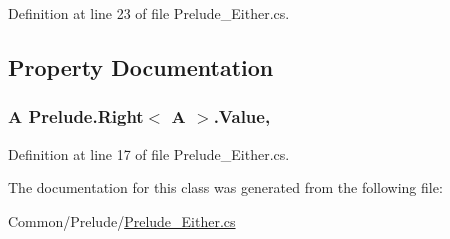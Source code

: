 Definition at line 23 of file Prelude\+\_\+\+Either.\+cs.



\subsection{Property Documentation}
\hypertarget{class_prelude_1_1_right_3_01_a_01_4_a1bf3aab3dbfdabed1a72320522f46f32}{
\subsubsection[{Value}]{\setlength{\rightskip}{0pt plus 5cm}A {\bf Prelude.\+Right}$<$ A $>$.Value\hspace{0.3cm}{\ttfamily [get]}, {\ttfamily [set]}}}\label{class_prelude_1_1_right_3_01_a_01_4_a1bf3aab3dbfdabed1a72320522f46f32}


Definition at line 17 of file Prelude\+\_\+\+Either.\+cs.



The documentation for this class was generated from the following file\+:\begin{DoxyCompactItemize}
\item 
Common/\+Prelude/\hyperlink{_prelude___either_8cs}{Prelude\+\_\+\+Either.\+cs}\end{DoxyCompactItemize}
